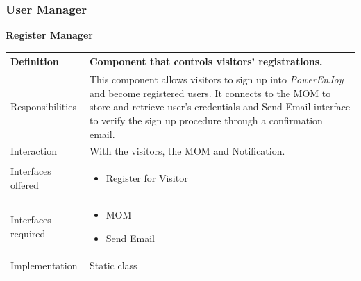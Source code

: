 \documentclass{article}
\newcommand{\pej}{\mbox{\normalfont\itshape PowerEnJoy }}
\begin{document}
			\subsubsection{User Manager}
			\begin{minipage}{\linewidth}
			\end{minipage}
			\begin{center}
				\centerline{\textbf{Register Manager}}	
				\begin{tabular}{| l | p{9cm} |}\hline
					Definition & Component that controls visitors' registrations.\\\hline
					Responsibilities & This component allows visitors to sign up into \pej{} and become registered users. It connects to the MOM to store and retrieve user's credentials and Send Email interface to verify the sign up procedure through a confirmation email.\\\hline
					Interaction & With the visitors, the MOM and Notification.\\\hline
					Interfaces offered & \begin{itemize}
						\item Register for Visitor
					\end{itemize}\\\hline
					Interfaces required & \begin{itemize}
						\item MOM
						\item Send Email
					\end{itemize}\\\hline
					Implementation & Static class\\\hline
				\end{tabular}
			\end{center}
			
\end{document}
